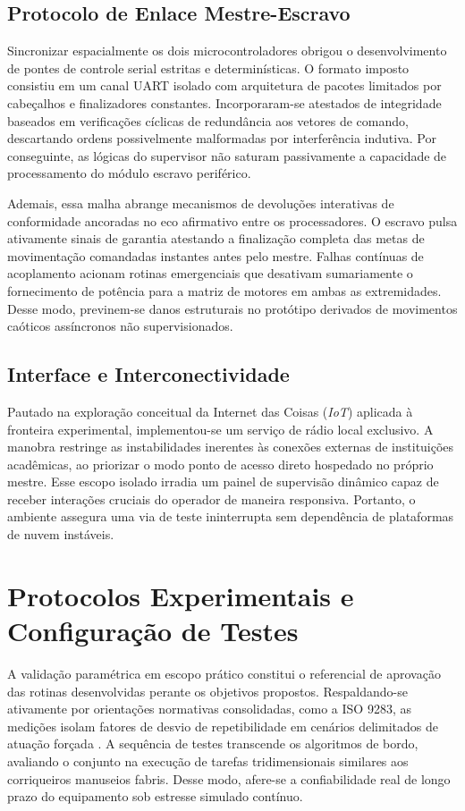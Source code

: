 \subsection{Protocolo de Enlace Mestre-Escravo}

Sincronizar espacialmente os dois microcontroladores obrigou o desenvolvimento de pontes de controle serial estritas e determinísticas. O formato imposto consistiu em um canal UART isolado com arquitetura de pacotes limitados por cabeçalhos e finalizadores constantes. Incorporaram-se atestados de integridade baseados em verificações cíclicas de redundância aos vetores de comando, descartando ordens possivelmente malformadas por interferência indutiva. Por conseguinte, as lógicas do supervisor não saturam passivamente a capacidade de processamento do módulo escravo periférico.

Ademais, essa malha abrange mecanismos de devoluções interativas de conformidade ancoradas no eco afirmativo entre os processadores. O escravo pulsa ativamente sinais de garantia atestando a finalização completa das metas de movimentação comandadas instantes antes pelo mestre. Falhas contínuas de acoplamento acionam rotinas emergenciais que desativam sumariamente o fornecimento de potência para a matriz de motores em ambas as extremidades. Desse modo, previnem-se danos estruturais no protótipo derivados de movimentos caóticos assíncronos não supervisionados.

\subsection{Interface e Interconectividade}

Pautado na exploração conceitual da Internet das Coisas (\textit{IoT}) aplicada à fronteira experimental, implementou-se um serviço de rádio local exclusivo. A manobra restringe as instabilidades inerentes às conexões externas de instituições acadêmicas, ao priorizar o modo ponto de acesso direto hospedado no próprio mestre. Esse escopo isolado irradia um painel de supervisão dinâmico capaz de receber interações cruciais do operador de maneira responsiva. Portanto, o ambiente assegura uma via de teste ininterrupta sem dependência de plataformas de nuvem instáveis.

\section{Protocolos Experimentais e Configuração de Testes}

A validação paramétrica em escopo prático constitui o referencial de aprovação das rotinas desenvolvidas perante os objetivos propostos. Respaldando-se ativamente por orientações normativas consolidadas, como a ISO 9283, as medições isolam fatores de desvio de repetibilidade em cenários delimitados de atuação forçada . A sequência de testes transcende os algoritmos de bordo, avaliando o conjunto na execução de tarefas tridimensionais similares aos corriqueiros manuseios fabris. Desse modo, afere-se a confiabilidade real de longo prazo do equipamento sob estresse simulado contínuo.

